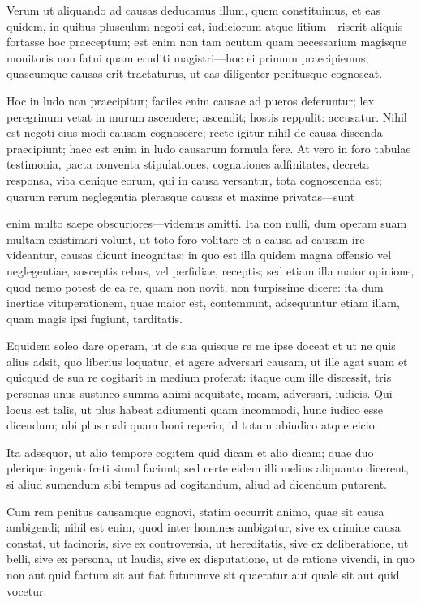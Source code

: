  Verum ut aliquando ad causas deducamus illum, quem constituimus, et eas quidem, in quibus plusculum negoti est, iudiciorum atque litium—riserit aliquis fortasse hoc praeceptum; est enim non tam acutum quam necessarium magisque monitoris non fatui quam eruditi magistri—hoc ei primum praecipiemus, quascumque causas erit tractaturus, ut eas diligenter penitusque cognoscat.

 Hoc in ludo non praecipitur; faciles enim causae ad pueros deferuntur; lex peregrinum vetat in murum ascendere; ascendit; hostis reppulit: accusatur. Nihil est negoti eius modi causam cognoscere; recte igitur nihil de causa discenda praecipiunt; haec est enim in ludo causarum formula fere. At vero in foro tabulae testimonia, pacta conventa stipulationes, cognationes adfinitates, decreta responsa, vita denique eorum, qui in causa versantur, tota cognoscenda est; quarum rerum neglegentia plerasque causas et maxime privatas—sunt

 enim multo saepe obscuriores—videmus amitti. Ita non nulli, dum operam suam multam existimari volunt, ut toto foro volitare et a causa ad causam ire videantur, causas dicunt incognitas; in quo est illa quidem magna offensio vel neglegentiae, susceptis rebus, vel perfidiae, receptis; sed etiam illa maior opinione, quod nemo potest de ea re, quam non novit, non turpissime dicere: ita dum inertiae vituperationem, quae maior est, contemnunt, adsequuntur etiam illam, quam magis ipsi fugiunt, tarditatis.

 Equidem soleo dare operam, ut de sua quisque re me ipse doceat et ut ne quis alius adsit, quo liberius loquatur, et agere adversari causam, ut ille agat suam et quicquid de sua re cogitarit in medium proferat: itaque cum ille discessit, tris personas unus sustineo summa animi aequitate, meam, adversari, iudicis. Qui locus est talis, ut plus habeat adiumenti quam incommodi, hunc iudico esse dicendum; ubi plus mali quam boni reperio, id totum abiudico atque eicio.

 Ita adsequor, ut alio tempore cogitem quid dicam et alio dicam; quae duo plerique ingenio freti simul faciunt; sed certe eidem illi melius aliquanto dicerent, si aliud sumendum sibi tempus ad cogitandum, aliud ad dicendum putarent.

 Cum rem penitus causamque cognovi, statim occurrit animo, quae sit causa ambigendi; nihil est enim, quod inter homines ambigatur, sive ex crimine causa constat, ut facinoris, sive ex controversia, ut hereditatis, sive ex deliberatione, ut belli, sive ex persona, ut laudis, sive ex disputatione, ut de ratione vivendi, in quo non aut quid factum sit aut fiat futurumve sit quaeratur aut quale sit aut quid vocetur.


